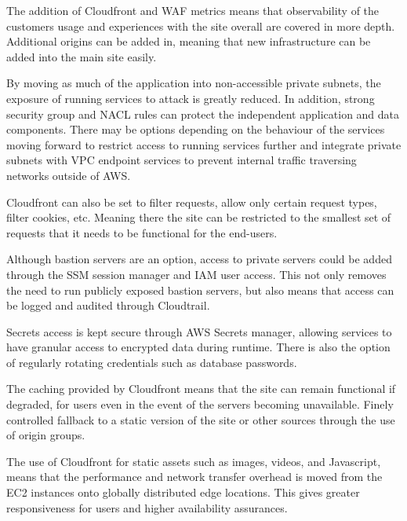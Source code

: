 
The addition of Cloudfront and WAF metrics means that observability of the customers usage and experiences with the site overall are covered in more depth. Additional origins can be added in, meaning that new infrastructure can be added into the main site easily.


By moving as much of the application into non-accessible private subnets, the exposure of running services to attack is greatly reduced. In addition, strong security group and NACL rules can protect the independent application and data components. There may be options depending on the behaviour of the services moving forward to restrict access to running services further and integrate private subnets with VPC endpoint services to prevent internal traffic traversing networks outside of AWS.

Cloudfront can also be set to filter requests, allow only certain request types, filter cookies, etc. Meaning there the site can be restricted to the smallest set of requests that it needs to be functional for the end-users.

Although bastion servers are an option, access to private servers could be added through the SSM session manager and IAM user access. This not only removes the need to run publicly exposed bastion servers, but also means that access can be logged and audited through Cloudtrail.

Secrets access is kept secure through AWS Secrets manager, allowing services to have granular access to encrypted data during runtime. There is also the option of regularly rotating credentials such as database passwords.


The caching provided by Cloudfront means that the site can remain functional if degraded, for users even in the event of the servers becoming unavailable. Finely controlled fallback to a static version of the site or other sources through the use of origin groups.


The use of Cloudfront for static assets such as images, videos, and Javascript, means that the performance and network transfer overhead is moved from the EC2 instances onto globally distributed edge locations. This gives greater responsiveness for users and higher availability assurances.




